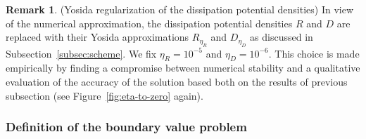 \documentclass[a4paper,10pt,oneside]{amsbook}
\numberwithin{section}{chapter}
\numberwithin{equation}{chapter}
\theoremstyle{definition}
\newtheorem{rmk}[prop]{Remark}
\begin{document}
\begin{rmk}(Yosida regularization of the dissipation potential densities)
In view of the numerical approximation, the dissipation potential densities $R$ and $D$ are replaced with their Yosida approximations $R_{\eta_R}$ and $D_{\eta_D}$ as discussed in Subsection~\ref{subsec:scheme}. We fix $\eta_R=10^{-5}$ and $\eta_D=10^{-6}$. This choice is made empirically by finding a compromise between numerical stability and a qualitative evaluation of the accuracy of the solution based both on the results of previous subsection (see Figure~\ref{fig:eta-to-zero} again).
\end{rmk}

\subsubsection*{Definition of the boundary value problem}
\end{document}
